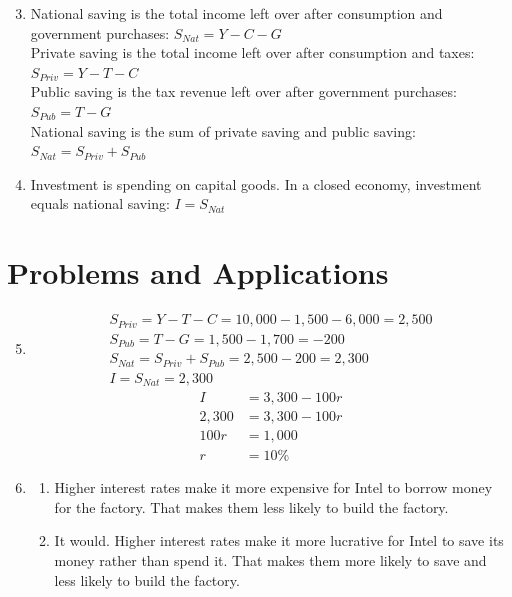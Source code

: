 \documentclass{article}
\begin{document}
\begin{enumerate}

\setcounter{enumi}{2}

\item National saving is the total income left over after consumption and government purchases: $S_{Nat} = Y - C - G$ \\
	Private saving is the total income left over after consumption and taxes: $S_{Priv} = Y - T - C$ \\
	Public saving is the tax revenue left over after government purchases: $S_{Pub} = T - G$ \\
	National saving is the sum of private saving and public saving: \\ $S_{Nat} = S_{Priv} + S_{Pub}$
	
\item Investment is spending on capital goods. In a closed economy, investment equals national saving: $I = S_{Nat}$

\end{enumerate}



\section*{Problems and Applications}

\begin{enumerate}

\setcounter{enumi}{4}

\item \begin{gather*}
	S_{Priv} = Y - T - C = 10,000 - 1,500 - 6,000 = 2,500 \\
	S_{Pub} = T - G = 1,500 - 1,700 = -200 \\
	S_{Nat} = S_{Priv} + S_{Pub} = 2,500 - 200 = 2,300 \\
	I = S_{Nat} = 2,300
	\end{gather*}
	\begin{align*}
	I &= 3,300 - 100r \\
	2,300 &= 3,300 - 100r \\
	100r &= 1,000 \\
	r &= 10\%
	\end{align*}
	
\item

	\begin{enumerate}
	
	\item Higher interest rates make it more expensive for Intel to borrow money for the factory. That makes them less likely to build the factory. 
	
	\item It would. Higher interest rates make it more lucrative for Intel to save its money rather than spend it. That makes them more likely to save and less likely to build the factory.
	
	\end{enumerate}

\end{enumerate}
\end{document}
